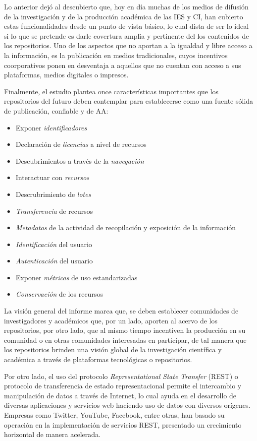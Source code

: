 Lo anterior dejó al descubierto que, hoy en día muchas de los medios de difusión de la investigación y de la producción académica de las IES y CI, han cubierto estas funcionalidades desde un punto de vista básico, lo cual dista de ser lo ideal si lo que se pretende es darle covertura amplia y pertinente del los contenidos de los repositorios. Uno de los aspectos que no aportan a la igualdad y libre acceso a la información, es la publicación en medios tradicionales, cuyos incentivos coorporativos ponen en desventaja a aquellos que no cuentan con acceso a sus plataformas, medios digitales o impresos.

Finalmente, el estudio plantea once características importantes que los repositorios del futuro deben contemplar para establecerse como una fuente sólida de publicación, confiable y de AA: \cite{NextGenerationRepositories}

\begin{itemize}
\item Exponer \textit{identificadores}
\item Declaración de \textit{licencias} a nivel de recursos
\item Descubrimientos a través de la \textit{navegación}
\item Interactuar con \textit{recursos}
\item Descrubrimiento de \textit{lotes}
\item \textit{Transferencia} de recursos
\item \textit{Metadatos} de la actividad de recopilación y exposición de la información
\item \textit{Identificación} del usuario
\item \textit{Autenticación} del usuario
\item Exponer \textit{métricas} de uso estandarizadas
\item \textit{Conservación} de los recursos
\end{itemize}

La visión general del informe marca que, se deben establecer comunidades de investigadores y académicos que, por un lado, aporten al acervo de los repositorios, por otro lado, que al mismo tiempo incentiven la producción en su comunidad o en otras comunidades interesadas en participar, de tal manera que los repositorios brinden una visión global de la investigación científica y académica a través de plataformas tecnológicas o repositorios.

Por otro lado, el uso del protocolo \textit{Representational State Transfer} (REST) o protocolo de transferencia de estado representacional permite el intercambio y manipulación de datos a través de Internet, lo cual ayuda en el desarrollo de diversas aplicaciones y servicios web haciendo uso de datos con diversos orígenes. Empresas como Twitter, YouTube, Facebook, entre otras, han basado su operación en la implementación de servicios REST, presentado un crecimiento horizontal de manera acelerada.

